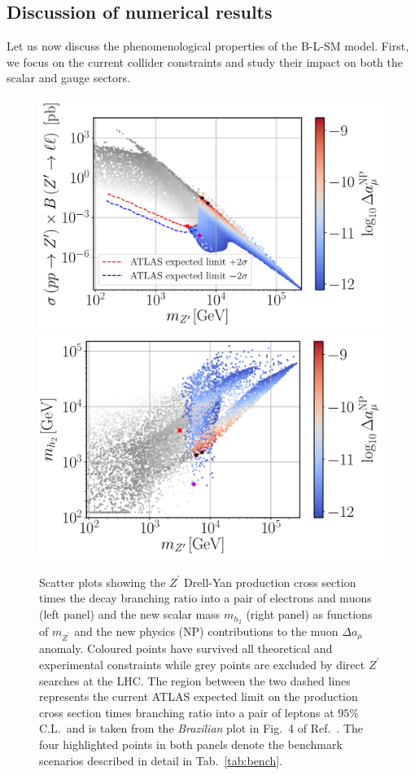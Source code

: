 \documentclass[a4paper,11pt]{article}
\renewcommand{\(}{\left(}
\renewcommand{\)}{\right)}
\renewcommand{\[}{\left[}
\renewcommand{\]}{\right]}
\begin{document}
\subsection{Discussion of numerical results}
\label{sec:discuss}

Let us now discuss the phenomenological properties of the B-L-SM model. First, we focus on the current collider constraints and study their impact on both the scalar and gauge sectors.
\begin{figure}[!htb]
	\centering
	\includegraphics[scale=0.37]{mZp_Xsec_Amu.pdf}
	\includegraphics[scale=0.37]{mZp_Mhp_Amu.pdf}
	\caption{Scatter plots showing the $Z^\prime$ Drell-Yan production cross section times the decay branching ratio into a pair of electrons and muons (left panel) and the new scalar mass $m_{h_2}$ (right panel) as functions of $m_{Z^\prime}$ and the new physics (NP) contributions to the muon $\Delta a_\mu$ anomaly. Coloured points have survived all theoretical and experimental constraints while grey points are excluded by direct $Z^\prime$ searches at the LHC. The region between the two dashed lines represents the current ATLAS expected limit on the production cross section times branching ratio into a pair of leptons at $95\%$ C.L.~and is taken from the \textit{Brazilian} plot in Fig.~4 of Ref.~\cite{Aaboud:2017buh}. The four highlighted points in both panels denote the benchmark scenarios described in detail in Tab.~\ref{tab:bench}.}
	\label{fig:Plots1}
\end{figure}	
\end{document}
